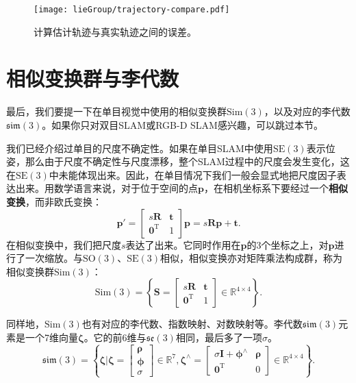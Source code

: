 \begin{figure}[!ht]
	\centering
	\texttt{[image: lieGroup/trajectory-compare.pdf]}
	\caption{计算估计轨迹与真实轨迹之间的误差。}
	\label{fig:trajectory-compare}
\end{figure}

\section{\textsuperscript{\ttfamily *}相似变换群与李代数}
最后，我们要提一下在单目视觉中使用的相似变换群$\mathrm{Sim}(3)$，以及对应的李代数$\mathfrak{sim}(3)$。如果你只对双目SLAM或RGB-D SLAM感兴趣，可以跳过本节。

我们已经介绍过单目的尺度不确定性。如果在单目SLAM中使用$\mathrm{SE}(3)$表示位姿，那么由于尺度不确定性与尺度漂移，整个SLAM过程中的尺度会发生变化，这在$\mathrm{SE}(3)$中未能体现出来。因此，在单目情况下我们一般会显式地把尺度因子表达出来。用数学语言来说，对于位于空间的点$\bm{p}$，在相机坐标系下要经过一个\textbf{相似变换}，而非欧氏变换：
\begin{equation}\label{key}
\bm{p}' = \left[ {\begin{array}{*{20}{c}}
	{s\bm{R}}&\bm{t}\\
	{{\bm{0}^\mathrm{T}}}&1
	\end{array}} \right] \bm{p}
	= s\bm{R} \bm{p} + \bm{t}.
\end{equation}
在相似变换中，我们把尺度$s$表达了出来。它同时作用在$\bm{p}$的3个坐标之上，对$\bm{p}$进行了一次缩放。与$\mathrm{SO}(3)$、$\mathrm{SE}(3)$相似，相似变换亦对矩阵乘法构成群，称为相似变换群$\mathrm{Sim}(3)$：
\begin{equation}\label{key}
\mathrm{Sim}(3) = \left\{ { \bm{S} = \left[ {\begin{array}{*{20}{c}}
		{s\bm{R}}& \bm{t}\\
		{{\bm{0}^\mathrm{T}}}&1
		\end{array}} \right] \in {\mathbb{R}^{4 \times 4}}} \right\}.
\end{equation}

同样地，$\mathrm{Sim}(3)$也有对应的李代数、指数映射、对数映射等。李代数$\mathfrak{sim}(3)$元素是一个7维向量$\boldsymbol{\zeta}$。它的前6维与$\mathfrak{se}(3)$相同，最后多了一项$\sigma$。
\begin{equation}
\mathfrak{sim} \left( 3 \right) = \left\{ { \boldsymbol{\zeta} | \boldsymbol{\zeta}  = \left[ \begin{array}{l}
	\boldsymbol{\rho} \\
	\boldsymbol{\phi} \\
	\sigma
	\end{array} \right] \in { \mathbb{R}^7},{ \boldsymbol{\zeta} ^ \wedge } = \left[ {\begin{array}{*{20}{c}}
		{\sigma \bm{I} + {\boldsymbol{\phi} ^ \wedge }}&\boldsymbol{\rho} \\
		{{\bm{0}^\mathrm{T}}}&0
		\end{array}} \right] \in {\mathbb{R}^{4 \times 4}}} \right\}.
\end{equation}

